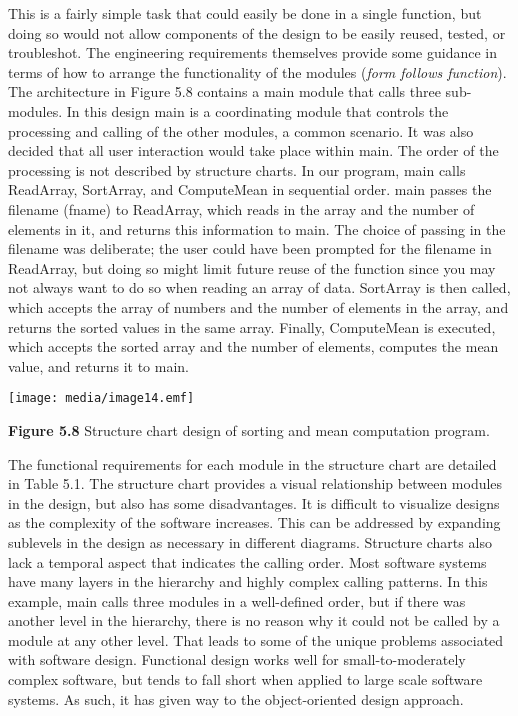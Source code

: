 This is a fairly simple task that could easily be done in a single
function, but doing so would not allow components of the design to be
easily reused, tested, or troubleshot. The engineering requirements
themselves provide some guidance in terms of how to arrange the
functionality of the modules (\emph{form follows function}). The
architecture in Figure 5.8 contains a main module that calls three
sub-modules. In this design main is a coordinating module that controls
the processing and calling of the other modules, a common scenario. It
was also decided that all user interaction would take place within main.
The order of the processing is not described by structure charts. In our
program, main calls ReadArray, SortArray, and ComputeMean in sequential
order. main passes the filename (fname) to ReadArray, which reads in the
array and the number of elements in it, and returns this information to
main. The choice of passing in the filename was deliberate; the user
could have been prompted for the filename in ReadArray, but doing so
might limit future reuse of the function since you may not always want
to do so when reading an array of data. SortArray is then called, which
accepts the array of numbers and the number of elements in the array,
and returns the sorted values in the same array. Finally, ComputeMean is
executed, which accepts the sorted array and the number of elements,
computes the mean value, and returns it to main.

\texttt{[image: media/image14.emf]}

\textbf{Figure 5.8} Structure chart design of sorting and mean
computation program.

The functional requirements for each module in the structure chart are
detailed in Table 5.1. The structure chart provides a visual
relationship between modules in the design, but also has some
disadvantages. It is difficult to visualize designs as the complexity of
the software increases. This can be addressed by expanding sublevels in
the design as necessary in different diagrams. Structure charts also
lack a temporal aspect that indicates the calling order. Most software
systems have many layers in the hierarchy and highly complex calling
patterns. In this example, main calls three modules in a well-defined
order, but if there was another level in the hierarchy, there is no
reason why it could not be called by a module at any other level. That
leads to some of the unique problems associated with software design.
Functional design works well for small-to-moderately complex software,
but tends to fall short when applied to large scale software systems. As
such, it has given way to the object-oriented design approach.

